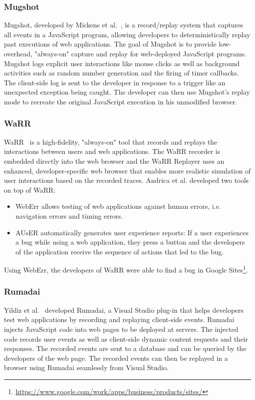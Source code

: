 \subsubsection{Mugshot}

Mugshot, developed by Mickens et al.~\cite{mugshot2010}, is a record/replay system that captures all events in a JavaScript program, allowing developers to deterministically replay past executions of web applications. The goal of Mugshot is to provide low-overhead, "always-on" capture and replay for web-deployed JavaScript programs. Mugshot logs explicit user interactions like mouse clicks as well as background activities such as random number generation and the firing of timer callbacks. The client-side log is sent to the developer in response to a trigger like an unexpected exception being caught. The developer can then use Mugshot's replay mode to recreate the original JavaScript execution in his unmodified browser. 

\subsubsection{WaRR}

WaRR~\cite{warr2011} is a high-fidelity, "always-on" tool that records and replays the interactions between users and web applications. The WaRR recorder is embedded directly into the web browser and the WaRR Replayer uses an enhanced, developer-specific web browser that enables more realistic simulation of user interactions based on the recorded traces. Andrica et al. developed two tools on top of WaRR:
\begin{itemize}
	\item WebErr allows testing of web applications against human errors, i.e. navigation errors and timing errors.
	\item AUsER automatically generates user experience reports: If a user experiences a bug while using a web application, they press a button and the developers of the application receive the sequence of actions that led to the bug.
\end{itemize}
Using WebErr, the developers of WaRR were able to find a bug in Google Sites\footnote{\url{https://www.google.com/work/apps/business/products/sites/}}.

\subsubsection{Rumadai}

Yildiz et al.~\cite{rumadai2012} developed Rumadai, a Visual Studio plug-in that helps developers test web applications by recording and replaying client-side events. Rumadai injects JavaScript code into web pages to be deployed at servers. The injected code records user events as well as client-side dynamic content requests and their responses. The recorded events are sent to a database and can be queried by the developers of the web page. The recorded events can then be replayed in a browser using Rumadai seamlessly from Visual Studio.

